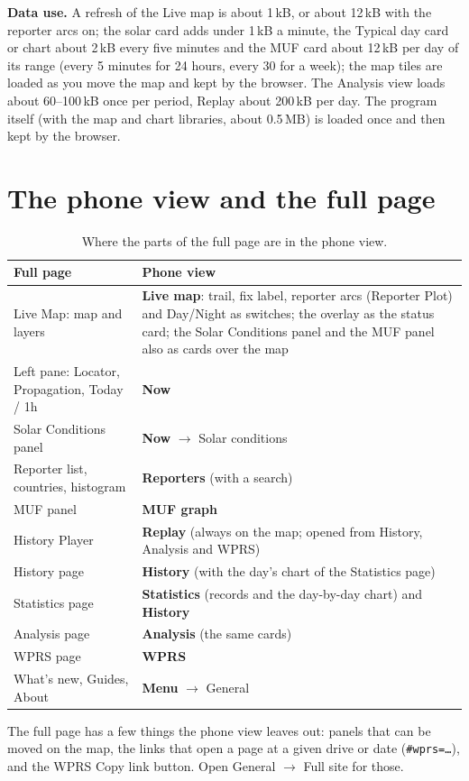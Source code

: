 \documentclass[10pt,a4paper]{article}
\newcommand{\ui}[1]{\textsf{\small #1}}            %
\newcommand{\lead}[1]{\textbf{#1}\enspace}           %
\begin{document}
\lead{Data use.} A refresh of the Live map is about 1\,kB, or about 12\,kB with the reporter arcs on; the solar card adds under 1\,kB a minute, the Typical day card or chart about 2\,kB every five minutes and the MUF card about 12\,kB per day of its range (every 5 minutes for 24 hours, every 30 for a week); the map tiles are loaded as you move the map and kept by the browser. The Analysis view loads about 60--100\,kB once per period, Replay about 200\,kB per day. The program itself (with the map and chart libraries, about 0.5\,MB) is loaded once and then kept by the browser.

\section{The phone view and the full page}
\begin{table}[H]\small\centering
\begin{tabularx}{\textwidth}{@{}>{\raggedright}p{3.1cm}>{\raggedright\arraybackslash}X@{}}
\toprule
\textbf{Full page} & \textbf{Phone view} \\ \midrule
Live Map: map and layers & \textbf{Live map}: trail, fix label, reporter arcs (Reporter Plot) and Day/Night as switches; the overlay as the status card; the Solar Conditions panel and the MUF panel also as cards over the map \\
Left pane: Locator, Propagation, Today / 1h & \textbf{Now} \\
Solar Conditions panel & \textbf{Now} $\rightarrow$ Solar conditions \\
Reporter list, countries, histogram & \textbf{Reporters} (with a search) \\
MUF panel & \textbf{MUF graph} \\
History Player & \textbf{Replay} (always on the map; opened from History, Analysis and WPRS) \\
History page & \textbf{History} (with the day's chart of the Statistics page) \\
Statistics page & \textbf{Statistics} (records and the day-by-day chart) and \textbf{History} \\
Analysis page & \textbf{Analysis} (the same cards) \\
WPRS page & \textbf{WPRS} \\
What's new, Guides, About & \textbf{Menu} $\rightarrow$ General \\
\bottomrule
\end{tabularx}
\caption{Where the parts of the full page are in the phone view.}
\end{table}
The full page has a few things the phone view leaves out: panels that can be moved on the map, the links that open a page at a given drive or date (\texttt{\#wprs=\dots}), and the WPRS \ui{Copy link} button. Open \ui{General} $\rightarrow$ \ui{Full site} for those.
\end{document}
